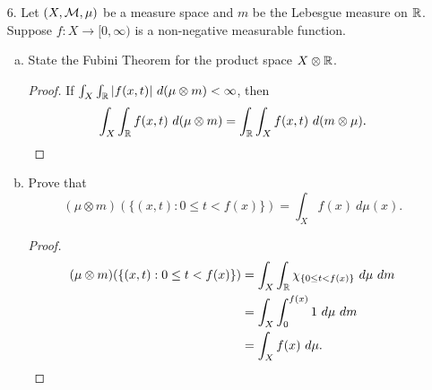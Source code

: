 \begin{itemize}
\begin{proof}
Recall $\mu(A_1 \cup A_2) = \mu(A_1) + \mu(A_2) - \mu(A_1 \cap A_2)$. This, along with $B_1 \subseteq A_1, \ B_1 \subseteq A_1$ $\Rightarrow B_1 \cap B_2 \subseteq A_1 \cap A_2$ $\Rightarrow \mu(B_1 \cap B_2) \leq \mu(A_1 \cap A_2)$ gives us 
\begin{align*}
    \mu(A_1 \cup A_2) - \mu(B_1 \cup B_2) &= \mu(A_1) + \mu(A_2) - \mu(B_1) - \mu(B_2) - \mu(A_1 \cap A_2) + \mu(B_1 \cap B_2) \\
    &\leq \mu(A_1) + \mu(A_2) - \mu(B_1) - \mu(B_2) - \mu(A_1 \cap A_2) + \mu(A_1 \cap A_2) \\
    &=\mu(A_1) + \mu(A_2) - \mu(B_1) - \mu(B_2).
\end{align*}
This gives our base case, justifying induction. Suppose that the statement is true for $k$ many sets. 
\begin{align*}
    \mu(\bigcup_{n=1}^k A_n \cup A_{n+1}) - \mu(\bigcup_{n=1}^k B_n \cup B_{n+1}) &\leq \mu(\bigcup_{n=1}^k A_n) + \mu(A_{n+1}) - \mu(\bigcup_{n=1}^k B_n) - \mu(B_{n+1}) \\
    &\leq \sum_{n=1}^k\mu(A_n) + \mu(A_{n+1}) - \sum_{n=1}^k\mu(B_n) - \mu(B_{n+1}) \\
    &= \sum_{n=1}^{k+1}\mu(A_n) - \sum_{n=1}^{k+1}\mu(B_n).
\end{align*}
\end{proof}





\item[6.] Let $(X,\mathcal{M}, \mu)$ be a measure space and $m$ be the Lebesgue measure on $\mathbb{R}$.
Suppose $f : X \rightarrow [0,\infty)$ is a non-negative measurable function.
\begin{enumerate}[(a)]
\item State the Fubini Theorem for the product space $X \otimes \mathbb{R}$.
\begin{proof}
If $\int_{X} \int_{\mathbb{R}} |f(x,t)| \ d(\mu \otimes m) < \infty$, then 
$$\int_{X} \int_{\mathbb{R}} f(x,t) \ d(\mu \otimes m) = \int_{\mathbb{R}} \int_{X}  f(x,t) \ d(m \otimes \mu).$$
\end{proof}

\item Prove that 
$$(\mu \otimes m)(\{(x,t) : 0\leq t < f(x)\}) = \int_{X} f(x) \ d\mu(x).$$
\begin{proof}
\begin{align*}
    (\mu \otimes m)(\{(x,t) : 0\leq t < f(x)\}) &= \int_{X} \int_{\mathbb{R}} \chi_{\{0 \leq t < f(x)\}} \ d\mu \ dm \\
    &= \int_{X} \int_{0}^{f(x)} 1 \ d\mu \ dm \\
    &= \int_{X} f(x) \ d\mu.
\end{align*}
\end{proof}


\end{enumerate}
\end{itemize}
